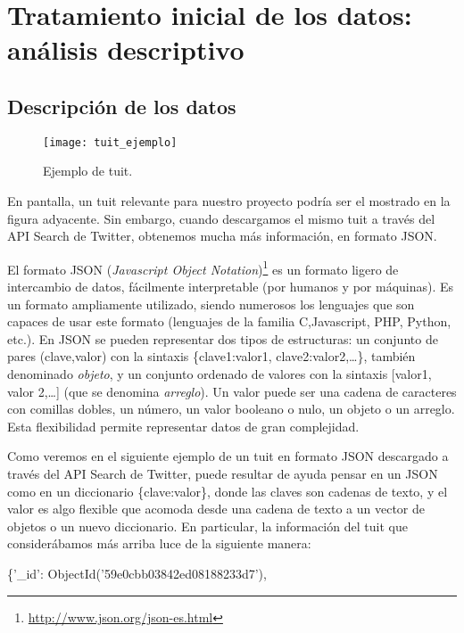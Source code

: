 \chapter{Tratamiento inicial de los datos: análisis descriptivo}
\label{chap:tratamiento_inicial_de_los_datos}

\section{Descripci\'on de los datos}


\begin{wrapfigure}[17]{R}{0.5\textwidth}
\texttt{[image: tuit\_ejemplo]}
\caption{Ejemplo de tuit.}\label{fig:tuit_ejemplo}
\end{wrapfigure} 


En pantalla, un tuit relevante para nuestro proyecto podría ser el 
mostrado en la figura ad\-ya\-cente. Sin embargo, cuando descargamos el mismo tuit a través del API Search de Twitter, 
obtenemos mucha más información, en formato JSON. 

El formato JSON ({\em Javascript Object Notation})\footnote{\url{http://www.json.org/json-es.html}} 
es un formato ligero de intercambio de datos, fácilmente interpretable (por humanos y por
máquinas). Es un formato ampliamente utilizado, siendo numerosos los
lenguajes que son capaces de usar este formato (lenguajes de la familia C,Javascript, PHP, Python, etc.). 
En JSON se pueden representar dos tipos
de estructuras: un conjunto de pares (clave,valor) con la sintaxis \{clave1:valor1, clave2:valor2,\dots\}, también
denominado {\em objeto}, y un conjunto ordenado de valores con la sintaxis [valor1, valor 2,\dots] (que se denomina {\em arreglo}). 
Un valor puede ser una cadena de caracteres con comillas dobles, un número, un valor booleano o nulo, 
un objeto o un arreglo. Esta flexibilidad permite representar datos de gran complejidad.

Como veremos en el siguiente ejemplo de un tuit en formato JSON descargado a través del API Search de Twitter,
puede resultar de ayuda pensar en un JSON como en un diccionario \{clave:valor\}, donde las claves
son cadenas de texto, y el valor es algo flexible que acomoda desde una cadena de texto a un vector de objetos 
o un nuevo diccionario. En particular, la información del tuit que considerábamos más arriba 
luce de la siguiente manera:

\bigskip


\{'\_id': ObjectId('59e0cbb03842ed08188233d7'),

